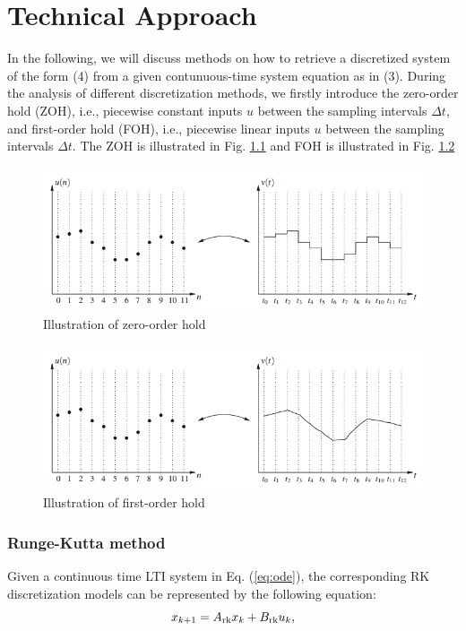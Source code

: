 \chapter{Technical Approach}
In the following, we will discuss methods on how to retrieve a discretized system of the form (4) from a given contunuous-time system equation as in (3). During the analysis of different discretization methods, we firstly introduce the zero-order hold (ZOH), i.e., piecewise constant inputs $u$ between the sampling intervals $\Delta t$, and first-order hold (FOH), i.e., piecewise linear inputs $u$ between the sampling intervals $\Delta t$. The ZOH is illustrated in Fig. \ref{fig:ZOH} and FOH is illustrated in Fig. \ref{fig:FOH}
\begin{figure}[h]
	\centering
	\includegraphics[width=\linewidth]{pics/ZOH.png}
	\caption{Illustration of zero-order hold \cite{grune2017nonlinear}}
	\label{fig:ZOH}
\end{figure}
\begin{figure}[h]
	\centering
	\includegraphics[width=\linewidth]{pics/FOH.png}
	\caption{Illustration of first-order hold}
	\label{fig:FOH}
\end{figure}


\subsection{Runge-Kutta method}
Given a continuous time LTI system in Eq. (\ref{eq:ode}), the corresponding RK discretization models can be represented by the following equation:
\begin{equation}
	x_{k+1} = A_{\rm{rk}}x_k + B_{\rm{rk}}u_k,
	\label{eq5}
\end{equation}

